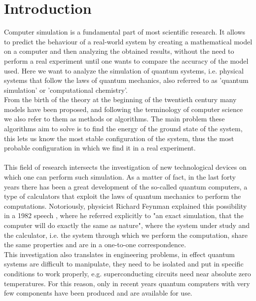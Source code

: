 \chapter*{Introduction} \label{Introduction}

Computer simulation is a fundamental part of most scientific research. It allows to predict the behaviour of a real-world system by creating a mathematical model on a computer and then analyzing the obtained results, without the need to perform a real experiment until one wants to compare the accuracy of the model used. Here we want to analyze the simulation of quantum systems, i.e. physical systems that follow the laws of quantum mechanics, also referred to as 'quantum simulation' or 'computational chemistry'. \\
From the birth of the theory at the beginning of the twentieth century many models have been proposed, and following the terminology of computer science we also refer to them as methods or algorithms. The main problem these algorithms aim to solve is to find the energy of the ground state of the system, this lets us know the most stable configuration of the system, thus the most probable configuration in which we find it in a real experiment. \\
\\
This field of research intersects the investigation of new technological devices on which one can perform such simulation. As a matter of fact, in the last forty years there has been a great development of the so-called quantum computers, a type of calculators that exploit the laws of quantum mechanics to perform the computations. Notoriously, physicist Richard Feynman explained this possibility in a 1982 speech \cite{Feynman1982Jun}, where he referred explicitly to "an exact simulation, that the computer will do exactly the same as nature", where the system under study and the calculator, i.e. the system through which we perform the computation, share the same properties and are in a one-to-one correspondence. \\
This investigation also translates in engineering problems, in effect quantum systems are difficult to manipulate, they need to be isolated and put in specific conditions to work properly, e.g. superconducting circuits need near absolute zero temperatures. For this reason, only in recent years quantum computers with very few components have been produced and are available for use. \\
\\
